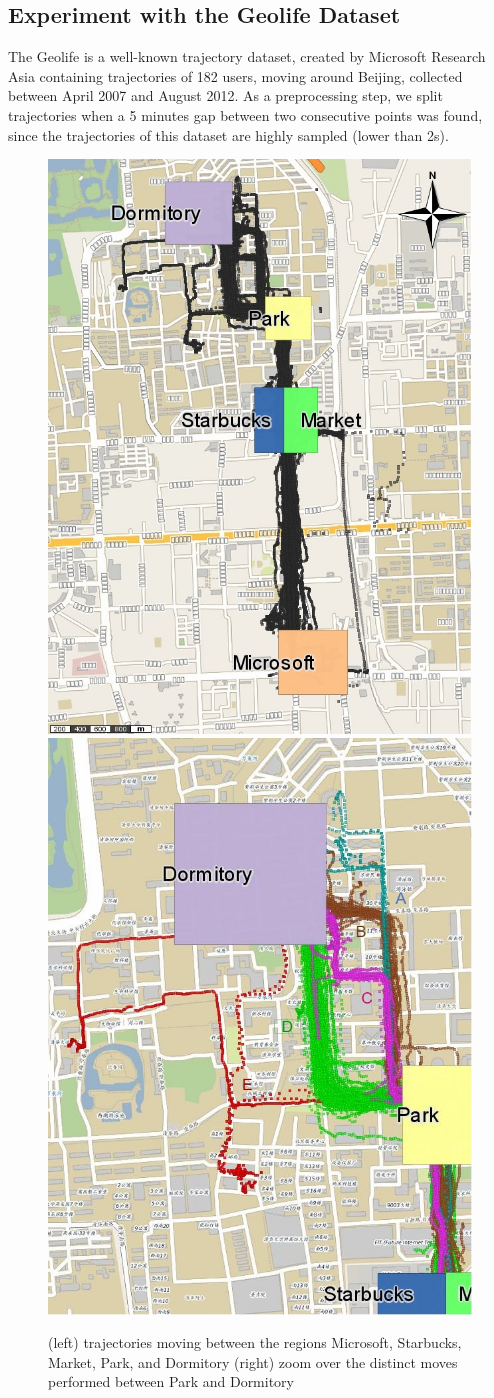 \documentclass[12pt]{article}
\begin{document}
\subsection{Experiment with the Geolife Dataset}\label{sec:geolife}

The Geolife is a well-known trajectory dataset, created by Microsoft Research Asia \citep{zheng2009mining} containing trajectories of 182 users, moving around Beijing, collected between April 2007 and August 2012. As a preprocessing step, we split trajectories when a 5 minutes gap between two consecutive points was found, since the trajectories of this dataset are highly sampled (lower than 2s).

\begin{figure}[ht!]
\centering
\centerline{
\includegraphics[width=.5\textwidth]{Images/Geolife-Trajectories-painted.jpg}
\includegraphics[width=.5\textwidth]{Images/Geolife-Paths-painted.jpg}
}
\caption{(left) trajectories moving between the regions Microsoft, Starbucks, Market, Park, and Dormitory (right) zoom over the distinct moves performed between Park and Dormitory}
\label{fig:geolife_map_rois}
\end{figure}
\end{document}
